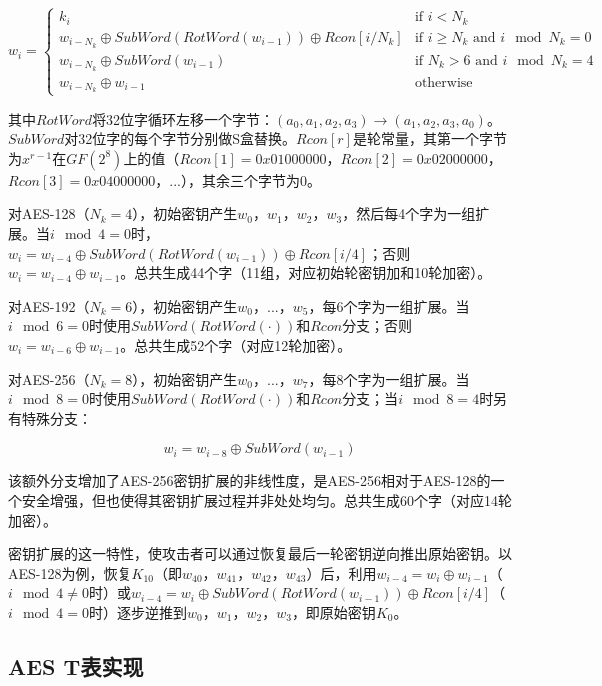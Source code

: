 \begin{equation}
w_i = \begin{cases} k_i & \text{if } i < N_k \\ w_{i-N_k} \oplus SubWord(RotWord(w_{i-1})) \oplus Rcon[i/N_k] & \text{if } i \geq N_k \text{ and } i \mod N_k = 0 \\ w_{i-N_k} \oplus SubWord(w_{i-1}) & \text{if } N_k > 6 \text{ and } i \mod N_k = 4 \\ w_{i-N_k} \oplus w_{i-1} & \text{otherwise} \end{cases}
\end{equation}

其中$RotWord$将32位字循环左移一个字节：$(a_0, a_1, a_2, a_3) \rightarrow (a_1, a_2, a_3, a_0)$。$SubWord$对32位字的每个字节分别做S盒替换。$Rcon[r]$是轮常量，其第一个字节为$x^{r-1}$在$GF(2^8)$上的值（$Rcon[1] = 0x01000000$，$Rcon[2] = 0x02000000$，$Rcon[3] = 0x04000000$，...），其余三个字节为0。

对AES-128（$N_k = 4$），初始密钥产生$w_0$，$w_1$，$w_2$，$w_3$，然后每4个字为一组扩展。当$i \mod 4 = 0$时，$w_i = w_{i-4} \oplus SubWord(RotWord(w_{i-1})) \oplus Rcon[i/4]$；否则$w_i = w_{i-4} \oplus w_{i-1}$。总共生成44个字（11组，对应初始轮密钥加和10轮加密）。

对AES-192（$N_k = 6$），初始密钥产生$w_0$，$...$，$w_5$，每6个字为一组扩展。当$i \mod 6 = 0$时使用$SubWord(RotWord(\cdot))$和$Rcon$分支；否则$w_i = w_{i-6} \oplus w_{i-1}$。总共生成52个字（对应12轮加密）。

对AES-256（$N_k = 8$），初始密钥产生$w_0$，$...$，$w_7$，每8个字为一组扩展。当$i \mod 8 = 0$时使用$SubWord(RotWord(\cdot))$和$Rcon$分支；当$i \mod 8 = 4$时另有特殊分支：

\begin{equation}
w_i = w_{i-8} \oplus SubWord(w_{i-1})
\end{equation}

该额外分支增加了AES-256密钥扩展的非线性度，是AES-256相对于AES-128的一个安全增强，但也使得其密钥扩展过程并非处处均匀。总共生成60个字（对应14轮加密）。

密钥扩展的这一特性，使攻击者可以通过恢复最后一轮密钥逆向推出原始密钥。以AES-128为例，恢复$K_{10}$（即$w_{40}$，$w_{41}$，$w_{42}$，$w_{43}$）后，利用$w_{i-4} = w_i \oplus w_{i-1}$（$i \mod 4 \neq 0$时）或$w_{i-4} = w_i \oplus SubWord(RotWord(w_{i-1})) \oplus Rcon[i/4]$（$i \mod 4 = 0$时）逐步逆推到$w_0$，$w_1$，$w_2$，$w_3$，即原始密钥$K_0$。

\subsection{AES T表实现}

